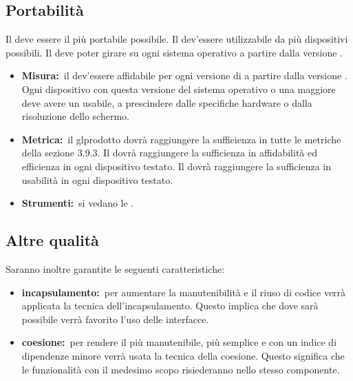 \subsection{Portabilità}
Il  deve essere il più portabile possibile. Il  dev'essere utilizzabile da più dispositivi possibili. Il  deve poter girare su ogni sistema operativo  a partire dalla versione .
\begin{itemize}
\item \textbf{Misura:}\ il  dev'essere affidabile per ogni versione di  a partire dalla versione . Ogni dispositivo con questa versione del sistema operativo o una maggiore deve avere un  usabile, a prescindere dalle specifiche hardware o dalla risoluzione dello schermo.
\item \textbf{Metrica:}\ il gl{prodotto} dovrà raggiungere la sufficienza in tutte le metriche della sezione 3.9.3. Il  dovrà raggiungere la sufficienza in affidabilità ed efficienza in ogni dispositivo testato. Il  dovrà raggiungere la sufficienza in usabilità in ogni dispositivo testato.
\item \textbf{Strumenti:}\ si vedano le \NPdoc.
\end{itemize}

\subsection{Altre qualità}
Saranno inoltre garantite le seguenti caratteristiche:
\begin{itemize}
\item \textbf{incapsulamento:}\ per aumentare la manutenibilità e il riuso di codice verrà applicata la tecnica dell'incapsulamento. Questo implica che dove sarà possibile verrà favorito l'uso delle interfacce.
\item \textbf{coesione:}\ per rendere il  più manutenibile, più semplice e con un indice di dipendenze minore verrà usata la tecnica della coesione. Questo significa che le funzionalità con il medesimo scopo risiederanno nello stesso componente.
\end{itemize}